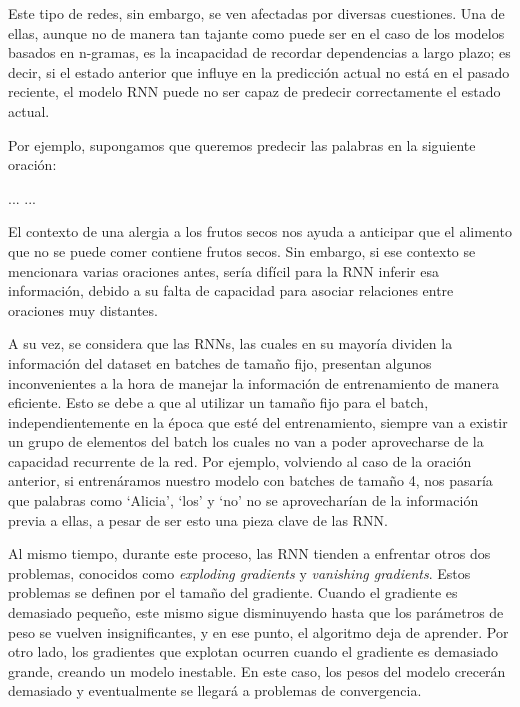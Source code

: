 Este tipo de redes, sin embargo, se ven afectadas por diversas cuestiones. Una de ellas, aunque no de manera tan tajante como puede ser en el caso de los modelos basados en n-gramas, es la incapacidad de recordar dependencias a largo plazo; es decir, si el estado anterior que influye en la predicción actual no está en el pasado reciente, el modelo RNN puede no ser capaz de predecir correctamente el estado actual.

Por ejemplo, supongamos que queremos predecir las palabras en la siguiente oración:

\begin{center}
    ...  ...
\end{center}

El contexto de una alergia a los frutos secos nos ayuda a anticipar que el alimento que no se puede comer contiene frutos secos. Sin embargo, si ese contexto se mencionara varias oraciones antes, sería difícil para la RNN inferir esa información, debido a su falta de capacidad para asociar relaciones entre oraciones muy distantes.

A su vez, se considera que las RNNs, las cuales en su mayoría dividen la información del dataset en batches de tamaño fijo,  presentan algunos inconvenientes a la hora de manejar la información de entrenamiento de manera eficiente. Esto se debe a que al utilizar un tamaño fijo para el batch, independientemente en la época que esté del entrenamiento, siempre van a existir un grupo de elementos del batch los cuales no van a poder aprovecharse de la capacidad recurrente de la red. Por ejemplo, volviendo al caso de la oración anterior, si entrenáramos nuestro modelo con batches de tamaño 4, nos pasaría que palabras como ‘Alicia’, ‘los’ y ‘no’ no se aprovecharían de la información previa a ellas, a pesar de ser esto una pieza clave de las RNN. \parencite{merity2017regularizingoptimizinglstmlanguage}

Al mismo tiempo, durante este proceso, las RNN tienden a enfrentar otros dos problemas, conocidos como \textit{exploding gradients} y \textit{vanishing gradients}. Estos problemas se definen por el tamaño del gradiente. Cuando el gradiente es demasiado pequeño, este mismo sigue disminuyendo hasta que los parámetros de peso se vuelven insignificantes, y en ese punto, el algoritmo deja de aprender. Por otro lado, los gradientes que explotan ocurren cuando el gradiente es demasiado grande, creando un modelo inestable. En este caso, los pesos del modelo crecerán demasiado y eventualmente se llegará a problemas de convergencia.

